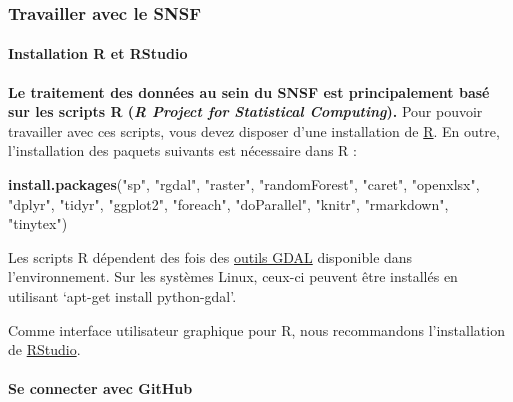 \documentclass[a4paper, notitlepage, 12pt, krantz2]{krantz}
\newenvironment{Shaded}{\begin{snugshade}}{\end{snugshade}}
\newcommand{\KeywordTok}[1]{\textcolor[rgb]{0.13,0.29,0.53}{\textbf{#1}}}
\newcommand{\NormalTok}[1]{#1}
\newcommand{\StringTok}[1]{\textcolor[rgb]{0.31,0.60,0.02}{#1}}
\let\oldparagraph\paragraph
\renewcommand{\paragraph}[1]{\oldparagraph{#1}\mbox{}}
\begin{document}
\hypertarget{travailler-avec-le-snsf}{%
\subsubsection{Travailler avec le SNSF}\label{travailler-avec-le-snsf}}

\hypertarget{installation-r-et-rstudio}{%
\paragraph{Installation R et RStudio}\label{installation-r-et-rstudio}}

\textbf{Le traitement des données au sein du SNSF est principalement basé sur les scripts R (\emph{R Project for Statistical Computing}).} Pour pouvoir travailler avec ces scripts, vous devez disposer d'une installation de \href{https://cloud.r-project.org/}{R}. En outre, l'installation des paquets suivants est nécessaire dans R :

\begin{Shaded}
\begin{Highlighting}[]
\KeywordTok{install.packages}\NormalTok{(}\StringTok{"sp"}\NormalTok{, }\StringTok{"rgdal"}\NormalTok{, }\StringTok{"raster"}\NormalTok{, }\StringTok{"randomForest"}\NormalTok{, }\StringTok{"caret"}\NormalTok{, }\StringTok{"openxlsx"}\NormalTok{, }
                 \StringTok{"dplyr"}\NormalTok{, }\StringTok{"tidyr"}\NormalTok{, }\StringTok{"ggplot2"}\NormalTok{, }\StringTok{"foreach"}\NormalTok{, }\StringTok{"doParallel"}\NormalTok{, }\StringTok{"knitr"}\NormalTok{, }
                 \StringTok{"rmarkdown"}\NormalTok{, }\StringTok{"tinytex"}\NormalTok{)}
\end{Highlighting}
\end{Shaded}

Les scripts R dépendent des fois des \href{https://gdal.org/programs/index.html\#raster-programs}{outils GDAL} disponible dans l'environnement. Sur les systèmes Linux, ceux-ci peuvent être installés en utilisant `apt-get install python-gdal'.

Comme interface utilisateur graphique pour R, nous recommandons l'installation de \href{https://rstudio.com/products/rstudio/download/}{RStudio}.

\hypertarget{se-connecter-avec-github}{%
\paragraph{Se connecter avec GitHub}\label{se-connecter-avec-github}}
\end{document}
